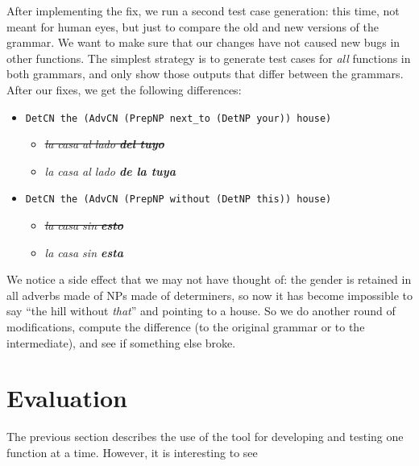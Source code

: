\documentclass[runningheads]{llncs}
\def\t#1{\texttt{#1}}
\begin{document}
After implementing the fix, we run a second test case generation: this
time, not meant for human eyes, but just to compare the old and new
versions of the grammar. We want to make sure that our changes 
have not caused new bugs in other functions. The simplest strategy is
to generate test cases for \emph{all} functions in both grammars, and
only show those outputs that differ between the grammars. After our
fixes, we get the following differences: 

\begin{itemize}
\item \t{DetCN the (AdvCN (PrepNP next\_to (DetNP your)) house)}
  \begin{itemize}
   \item \emph{\sout{la casa al lado {\bf  del tuyo}}}
   \item \emph{la casa al lado {\bf  de la tuya}}
  \end{itemize}
\item \t{DetCN the (AdvCN (PrepNP without (DetNP this)) house)}
  \begin{itemize}
   \item \emph{\sout{la casa sin {\bf  esto}}}
   \item \emph{la casa sin {\bf esta}}
  \end{itemize}
\end{itemize}

\noindent We notice a side effect that we may not have thought of: the
gender is retained in all adverbs made of NPs made of determiners, so
now it has become impossible to say ``the hill without \emph{that}'' and
pointing to a house. So we do another round of modifications, compute
the difference (to the original grammar or to the intermediate), and
see if something else broke.

\section{Evaluation}

The previous section describes the use of the tool for developing and
testing one function at a time. However, it is interesting to see 

\end{document}
